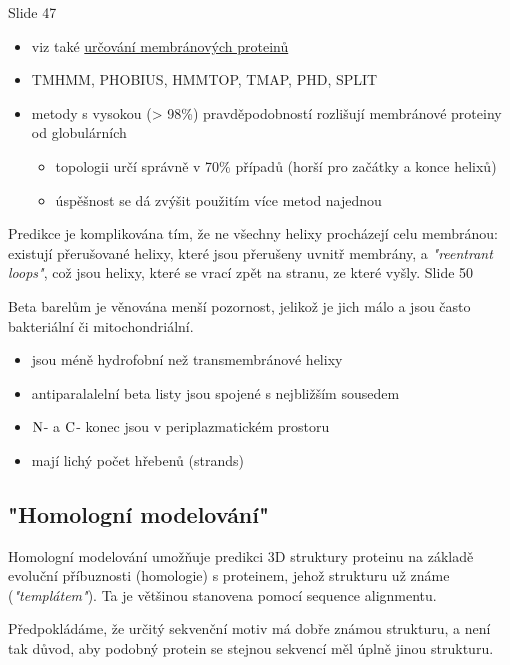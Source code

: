 \documentclass[DIV=8]{scrreprt}
\begin{document}
Slide 47
\begin{itemize}
    \item viz také \href{#Určování membránových proteinů}{určování membránových proteinů}
    \item TMHMM, PHOBIUS, HMMTOP, TMAP, PHD, SPLIT
    \item metody s vysokou (> 98\%) pravděpodobností rozlišují membránové proteiny od globulárních
\begin{itemize}
    \item topologii určí správně v 70\% případů (horší pro začátky a konce helixů)
    \item úspěšnost se dá zvýšit použitím více metod najednou
\end{itemize}

\end{itemize}


Predikce je komplikována tím, že ne všechny helixy procházejí celu membránou: existují přerušované helixy, které jsou přerušeny uvnitř membrány, a \emph{"reentrant loops"}, což jsou helixy, které se vrací zpět na stranu, ze které vyšly. Slide 50

Beta barelům je věnována menší pozornost, jelikož je jich málo a jsou často bakteriální či mitochondriální.

\begin{itemize}
    \item jsou méně hydrofobní než transmembránové helixy
    \item antiparalalelní beta listy jsou spojené s nejbližším sousedem
    \item \(\ce{N}\)- a \(\ce{C}\)- konec jsou v periplazmatickém prostoru
    \item mají lichý počet hřebenů (strands)
\end{itemize}


\subsection{"Homologní modelování"}

Homologní modelování umožňuje predikci 3D struktury proteinu na základě evoluční příbuznosti (homologie) s proteinem, jehož strukturu už známe (\emph{"templátem"}). Ta je většinou stanovena pomocí sequence alignmentu.

Předpokládáme, že určitý sekvenční motiv má dobře známou strukturu, a není tak důvod, aby podobný protein se stejnou sekvencí měl úplně jinou strukturu.
\end{document}
